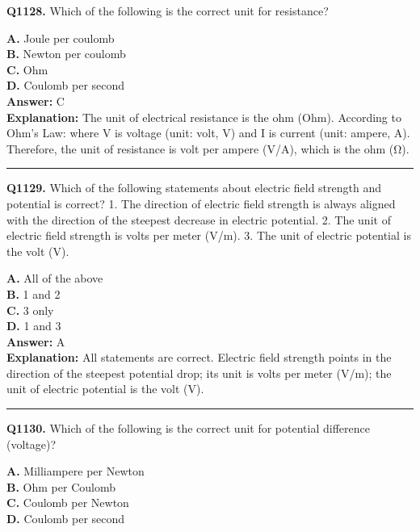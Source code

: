 \documentclass[12pt]{article}
\begin{document}
\noindent
\textbf{Q1128.} Which of the following is the correct unit for resistance?



\textbf{A.} Joule per coulomb \\
\textbf{B.} Newton per coulomb \\
\textbf{C.} Ohm \\
\textbf{D.} Coulomb per second \\

\textbf{Answer:} C \\
\textbf{Explanation:} The unit of electrical resistance is the ohm (Ohm). According to Ohm's Law:
where
V
is voltage (unit: volt, V) and
I
is current (unit: ampere, A). Therefore, the unit of resistance is volt per ampere (V/A), which is the ohm (Ω).

\hrule
\vspace{1em}


\noindent
\textbf{Q1129.} Which of the following statements about electric field strength and potential is correct?
1.
The direction of electric field strength is always aligned with the direction of the steepest decrease in electric potential.
2.
The unit of electric field strength is volts per meter (V/m).
3.
The unit of electric potential is the volt (V).



\textbf{A.} All of the above \\
\textbf{B.} 1 and 2 \\
\textbf{C.} 3 only \\
\textbf{D.} 1 and 3 \\

\textbf{Answer:} A \\
\textbf{Explanation:} All statements are correct. Electric field strength points in the direction of the steepest potential drop; its unit is volts per meter (V/m); the unit of electric potential is the volt (V).

\hrule
\vspace{1em}


\noindent
\textbf{Q1130.} Which of the following is the correct unit for potential difference (voltage)?



\textbf{A.} Milliampere per Newton \\
\textbf{B.} Ohm per Coulomb \\
\textbf{C.} Coulomb per Newton \\
\textbf{D.} Coulomb per second \\
\end{document}
